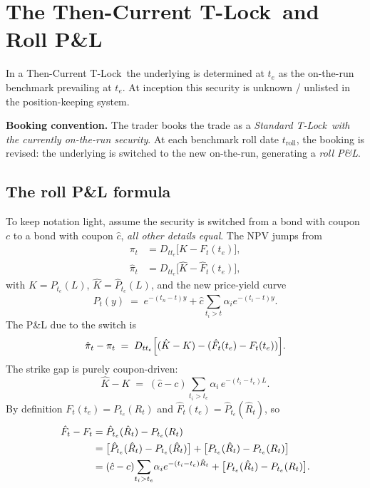 \documentclass[11pt]{article}
\theoremstyle{definition}
\newcommand{\Tlock}{T-Lock}
\begin{document}
\section{The Then-Current \Tlock\ and Roll P\&L}\label{sec:roll}

In a Then-Current \Tlock\ the underlying is determined at $t_e$ as the
on-the-run benchmark prevailing at $t_e$. At inception this security
is unknown / unlisted in the position-keeping system.

\textbf{Booking convention.} The trader books the trade as a
\emph{Standard \Tlock\ with the currently on-the-run security}.
At each benchmark roll date $t_{\mathrm{roll}}$, the booking is
revised: the underlying is switched to the new on-the-run, generating
a \emph{roll P\&L}.

\subsection{The roll P\&L formula}

To keep notation light, assume the security is switched from a bond
with coupon $c$ to a bond with coupon $\hat c$, \emph{all other details
equal}. The NPV jumps from
\begin{align}
\pi_t  &= D_{t t_e}\bigl[K - F_t(t_e)\bigr], \label{eq:roll-pi}\\
\hat\pi_t &= D_{t t_e}\bigl[\hat K - \hat F_t(t_e)\bigr], \label{eq:roll-pihat}
\end{align}
with $K = P_{t_e}(L)$, $\hat K = \hat P_{t_e}(L)$, and the new
price-yield curve
\begin{equation}
\hat P_t(y) \;=\; e^{-(t_n-t)y}
                 + \hat c\sum_{t_i>t}\alpha_i e^{-(t_i-t)y}.
\label{eq:Phat}
\end{equation}
The P\&L due to the switch is
\begin{equation}
\hat\pi_t - \pi_t
\;=\; D_{t t_e}\Bigl[(\hat K - K) - (\hat F_t(t_e) - F_t(t_e))\Bigr].
\label{eq:roll-pl}
\end{equation}
The strike gap is purely coupon-driven:
\begin{equation}
\hat K - K \;=\; (\hat c - c)\sum_{t_i > t_e}\alpha_i\,e^{-(t_i-t_e)L}.
\label{eq:strike-gap}
\end{equation}
By definition $F_t(t_e) = P_{t_e}(R_t)$ and
$\hat F_t(t_e) = \hat P_{t_e}(\hat R_t)$, so
\begin{align}
\hat F_t - F_t
  &= \hat P_{t_e}(\hat R_t) - P_{t_e}(R_t) \notag\\
  &= \bigl[\hat P_{t_e}(\hat R_t) - P_{t_e}(\hat R_t)\bigr]
    + \bigl[P_{t_e}(\hat R_t) - P_{t_e}(R_t)\bigr] \notag\\
  &= (\hat c - c)\!\sum_{t_i > t_e}\!\alpha_i e^{-(t_i-t_e)\hat R_t}
    + \bigl[P_{t_e}(\hat R_t) - P_{t_e}(R_t)\bigr].
\label{eq:fwd-gap}
\end{align}
\end{document}
